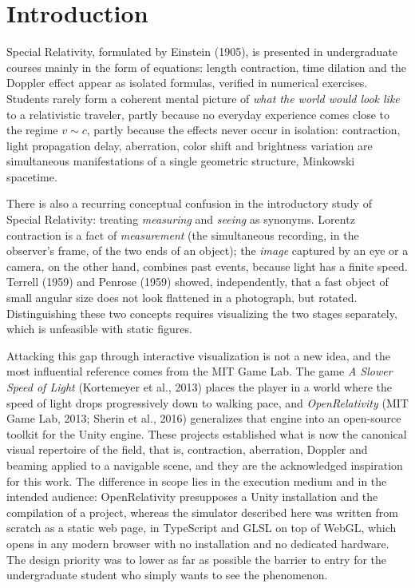 \documentclass[10pt,a4paper,twocolumn]{article}
\begin{document}
{\let\thefootnote\relax{}}

\section{Introduction}

Special Relativity, formulated by Einstein (1905), is presented in undergraduate courses
mainly in the form of equations: length contraction, time dilation and the Doppler effect
appear as isolated formulas, verified in numerical exercises. Students rarely form a
coherent mental picture of \emph{what the world would look like} to a relativistic
traveler, partly because no everyday experience comes close to the regime $v \sim c$,
partly because the effects never occur in isolation: contraction, light propagation delay,
aberration, color shift and brightness variation are simultaneous manifestations of a
single geometric structure, Minkowski spacetime.

There is also a recurring conceptual confusion in the introductory study of Special
Relativity: treating \emph{measuring} and \emph{seeing} as synonyms. Lorentz contraction
is a fact of \emph{measurement} (the simultaneous recording, in the observer's frame, of
the two ends of an object); the \emph{image} captured by an eye or a camera, on the other
hand, combines past events, because light has a finite speed. Terrell (1959) and Penrose
(1959) showed, independently, that a fast object of small angular size does not look
flattened in a photograph, but rotated. Distinguishing these two concepts requires
visualizing the two stages separately, which is unfeasible with static figures.

Attacking this gap through interactive visualization is not a new idea, and the most
influential reference comes from the MIT Game Lab. The game \emph{A Slower Speed of Light}
(Kortemeyer et al., 2013) places the player in a world where the speed of light drops
progressively down to walking pace, and \emph{OpenRelativity} (MIT Game Lab, 2013; Sherin
et al., 2016) generalizes that engine into an open-source toolkit for the Unity engine.
These projects established what is now the canonical visual repertoire of the field, that
is, contraction, aberration, Doppler and beaming applied to a navigable scene, and they
are the acknowledged inspiration for this work. The difference in scope lies in the
execution medium and in the intended audience: OpenRelativity presupposes a Unity
installation and the compilation of a project, whereas the simulator described here was
written from scratch as a static web page, in TypeScript and GLSL on top of WebGL, which
opens in any modern browser with no installation and no dedicated hardware. The design
priority was to lower as far as possible the barrier to entry for the undergraduate
student who simply wants to see the phenomenon.
\end{document}
